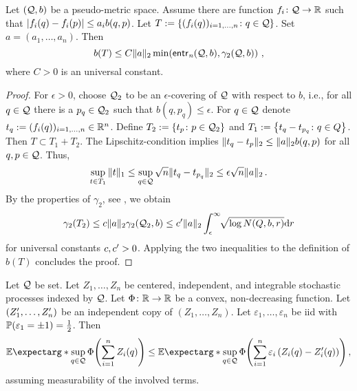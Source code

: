 %
\begin{lemma}\label{chaining:lipschitz}
Let $(\mathcal{Q}, b)$ be a pseudo-metric space.
Assume there are function $f_i \colon \mathcal{Q} \to \mathbb{R}$ such that $\left| f_i(q) - f_i(p) \right| \leq a_i b(q,p)$.
Let $T := \left\lbrace (f_i(q))_{i=1,\dots,n} \colon q\in\mathcal{Q} \right\rbrace$. Set $a = (a_1, \dots, a_n)$.
Then
\begin{equation*}
	b(T) \leq C \Vert a \Vert_2 \min\!\left( \operatorname{\mathsf{entr}_\mathit{n}}(\mathcal{Q}, b), \gamma_2(\mathcal{Q}, b) \right)
	\, ,
\end{equation*}
where $C>0$ is an universal constant.
\end{lemma}
%
\begin{proof}
	For $\epsilon>0$, choose $\mathcal{Q}_2$ to be an $\epsilon$-covering of $\mathcal{Q}$ with respect to $b$, i.e., for all $q \in \mathcal{Q}$ there is a $p_q \in \mathcal{Q}_2$ such that $b(q,p_q) \leq \epsilon$. For $q\in\mathcal{Q}$ denote $t_q := (f_i(q))_{i=1,\dots,n} \in \mathbb{R}^n$. Define $T_2 := \left\lbrace t_p \colon p\in\mathcal{Q}_2 \right\rbrace$ and $T_1 := \left\lbrace t_q - t_{p_q} \colon q\in Q \right\rbrace$. Then $T \subset T_1 + T_2$.
		The Lipschitz-condition implies $\Vert t_q-t_p \Vert_2 \leq \Vert a \Vert_2 b(q,p)$ for all $q,p\in\mathcal{Q}$.
		Thus, 
		\begin{equation*}
			\sup_{t\in T_1} \Vert t \Vert_1 \leq \sup_{q \in \mathcal{Q}} \sqrt{n}\Vert t_q-t_{p_q} \Vert_2 \leq \epsilon \sqrt{n} \Vert a \Vert_2 
			\, .
		\end{equation*}
		By the properties of $\gamma_2$, see \cite{talagrand14}, we obtain
		\begin{equation*}
			\gamma_2(T_2) \leq c \Vert a \Vert_2 \gamma_2(\mathcal{Q}_2, b) \leq c^\prime \Vert a \Vert_2  \int_{\epsilon}^\infty \!\! \sqrt{\log N(Q, b, r)} \mathrm{d} r
		\end{equation*}
		for universal constants $c, c^\prime>0$. Applying the two inequalities to the definition of $b(T)$ concludes the proof.
\end{proof}
%
\begin{lemma}[Symmetrization]\label{lmm:symm}
	Let $\mathcal{Q}$ be set. Let $Z_1, \dots, Z_n$ be centered, independent, and integrable stochastic processes indexed by $\mathcal{Q}$. Let $\Phi\colon \mathbb{R}\to\mathbb{R}$ be a convex, non-decreasing function. Let $(Z_1^\prime, \dots, Z_n^\prime)$ be an independent copy of $(Z_1, \dots, Z_n)$. Let $\varepsilon_1, \dots, \varepsilon_n$ be iid with $\mathbb{P}(\varepsilon_1 = \pm1) = \frac12$.
	Then
	\begin{equation*}
		\Ex*{\sup_{q\in\mc Q} \Phi\brOf{\sum_{i=1}^nZ_i(q)}} \leq
		\Ex*{\sup_{q\in\mc Q} \Phi\brOf{\sum_{i=1}^n\varepsilon_i\br{Z_i(q) - Z_i\pr(q)}}}
		\eqcm
	\end{equation*}
	assuming measurability of the involved terms.
\end{lemma}
